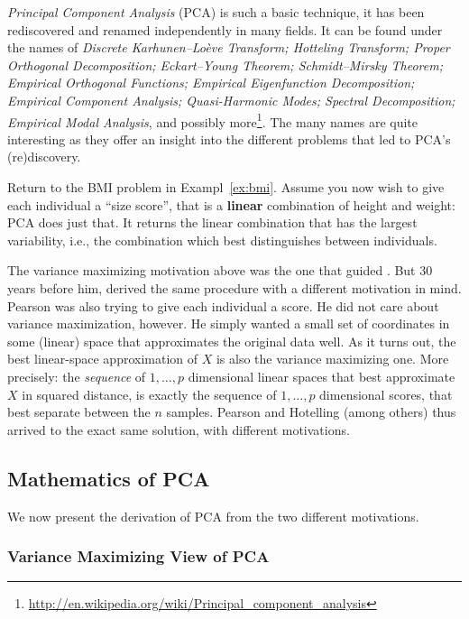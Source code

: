 \documentclass[12pt,a4paper]{article}
\begin{document}
\emph{Principal Component Analysis} (PCA) is such a basic technique, it has been rediscovered and renamed independently in many fields. 
It can be found under the names of 
\emph{
	Discrete Karhunen–Loève Transform; 
	Hotteling Transform; 
	Proper Orthogonal Decomposition; 
	Eckart–Young Theorem; 
	Schmidt–Mirsky Theorem;  
	Empirical Orthogonal Functions; 
	Empirical Eigenfunction Decomposition;  
	Empirical Component Analysis;  
	Quasi-Harmonic Modes;  
	Spectral Decomposition;  
	Empirical Modal Analysis}, 
and possibly more\footnote{\url{http://en.wikipedia.org/wiki/Principal_component_analysis} }.
The many names are quite interesting as they offer an insight into the different problems that led to PCA's (re)discovery.


Return to the BMI problem in Exampl~\ref{ex:bmi}.
Assume you now wish to give each individual a ``size score'', that is a \textbf{linear} combination of height and weight: PCA does just that. 
It returns the linear combination that has the largest variability, i.e., the combination which best distinguishes between individuals. 

The variance maximizing motivation above was the one that guided \citet{hotelling1933analysis}.
But $30$ years before him, \citet{pearson1901liii} derived the same procedure with a different motivation in mind. 
Pearson was also trying to give each individual a score. 
He did not care about variance maximization, however. 
He simply wanted a small set of coordinates in some (linear) space that approximates the original data well. 
As it turns out, the best linear-space approximation of $X$ is also the variance maximizing one. 
More precisely: the \emph{sequence} of $1,\dots,p$ dimensional linear spaces that best approximate $X$ in squared distance, is exactly the sequence of $1,\dots,p$ dimensional scores, that best separate between the $n$ samples. 
Pearson and Hotelling (among others) thus arrived to the exact same solution, with different motivations. 






\subsection{Mathematics of PCA}
\label{sec:pca_mathematics}
We now present the derivation of PCA from the two different motivations.

\subsubsection{Variance Maximizing View of PCA}
\end{document}
